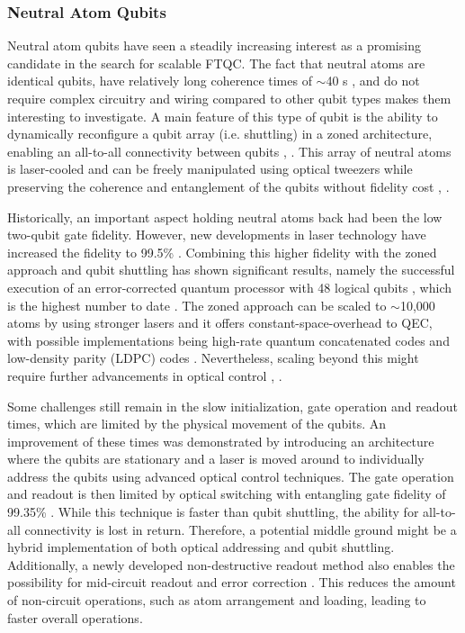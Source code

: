 \subsubsection{Neutral Atom Qubits}

Neutral atom qubits have seen a steadily increasing interest as a promising candidate in the search for scalable FTQC. The fact that neutral atoms are identical qubits, have relatively long coherence times of $\sim$40 s \cite{Barnes2022}, and do not require complex circuitry and wiring compared to other qubit types \cite{ball2024} makes them interesting to investigate. A main feature of this type of qubit is the ability to dynamically reconfigure a qubit array (i.e. shuttling) in a zoned architecture, enabling an all-to-all connectivity between qubits \cite{Bluvstein2024}, \cite{Bluvstein2022}. This array of neutral atoms is laser-cooled and can be freely manipulated using optical tweezers while preserving the coherence and entanglement of the qubits without fidelity cost \cite{Bluvstein2024}, \cite{Wintersperger2023}.

Historically, an important aspect holding neutral atoms back had been the low two-qubit gate fidelity. However, new developments in laser technology have increased the fidelity to 99.5\% \cite{Evered2023}. Combining this higher fidelity with the zoned approach and qubit shuttling has shown significant results, namely the successful execution of an error-corrected quantum processor with 48 logical qubits \cite{Bluvstein2024}, which is the highest number to date \cite{Swayne2023}. The zoned approach can be scaled to $\sim$10,000 atoms by using stronger lasers and it offers constant-space-overhead to QEC, with possible implementations being high-rate quantum concatenated codes and low-density parity (LDPC) codes \cite{sunami2024scalablenetworkingneutralatomqubits}. Nevertheless, scaling beyond this might require further advancements in optical control \cite{Bluvstein2024}, \cite{sunami2024scalablenetworkingneutralatomqubits}.

Some challenges still remain in the slow initialization, gate operation and readout times, which are limited by the physical movement of the qubits. An improvement of these times was demonstrated by introducing an architecture where the qubits are stationary and  a laser is moved around to individually address the qubits using advanced optical control techniques. The gate operation and readout is then limited by optical switching with entangling gate fidelity of 99.35\% \cite{radnaev2024universalneutralatomquantumcomputer}. 
While this technique is faster than qubit shuttling, the ability for all-to-all connectivity is lost in return. Therefore, a potential middle ground might be a hybrid implementation of both optical addressing and qubit shuttling.
Additionally, a newly developed non-destructive readout method also enables the possibility for  mid-circuit readout and error correction \cite{radnaev2024universalneutralatomquantumcomputer}. This reduces the amount of non-circuit operations, such as atom arrangement and loading, leading to faster overall operations.
